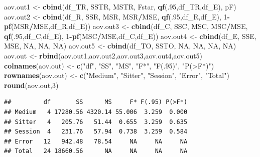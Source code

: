 \documentclass[
]{book}
\newenvironment{Shaded}{\begin{snugshade}}{\end{snugshade}}
\newcommand{\ConstantTok}[1]{\textcolor[rgb]{0.56,0.35,0.01}{#1}}
\newcommand{\DecValTok}[1]{\textcolor[rgb]{0.00,0.00,0.81}{#1}}
\newcommand{\FunctionTok}[1]{\textcolor[rgb]{0.13,0.29,0.53}{\textbf{#1}}}
\newcommand{\NormalTok}[1]{#1}
\newcommand{\OtherTok}[1]{\textcolor[rgb]{0.56,0.35,0.01}{#1}}
\newcommand{\SpecialCharTok}[1]{\textcolor[rgb]{0.81,0.36,0.00}{\textbf{#1}}}
\newcommand{\StringTok}[1]{\textcolor[rgb]{0.31,0.60,0.02}{#1}}
\begin{document}
\begin{Shaded}
\begin{Highlighting}[]
\NormalTok{aov.out1 }\OtherTok{\textless{}{-}} \FunctionTok{cbind}\NormalTok{(df\_TR, SSTR, MSTR, Fstar, }\FunctionTok{qf}\NormalTok{(.}\DecValTok{95}\NormalTok{,df\_TR,df\_E), pF)}
\NormalTok{aov.out2 }\OtherTok{\textless{}{-}} \FunctionTok{cbind}\NormalTok{(df\_R, SSR, MSR, MSR}\SpecialCharTok{/}\NormalTok{MSE, }\FunctionTok{qf}\NormalTok{(.}\DecValTok{95}\NormalTok{,df\_R,df\_E), }\DecValTok{1}\SpecialCharTok{{-}}\FunctionTok{pf}\NormalTok{(MSR}\SpecialCharTok{/}\NormalTok{MSE,df\_R,df\_E))}
\NormalTok{aov.out3 }\OtherTok{\textless{}{-}} \FunctionTok{cbind}\NormalTok{(df\_C, SSC, MSC, MSC}\SpecialCharTok{/}\NormalTok{MSE, }\FunctionTok{qf}\NormalTok{(.}\DecValTok{95}\NormalTok{,df\_C,df\_E), }\DecValTok{1}\SpecialCharTok{{-}}\FunctionTok{pf}\NormalTok{(MSC}\SpecialCharTok{/}\NormalTok{MSE,df\_C,df\_E))}
\NormalTok{aov.out4 }\OtherTok{\textless{}{-}} \FunctionTok{cbind}\NormalTok{(df\_E, SSE, MSE, }\ConstantTok{NA}\NormalTok{, }\ConstantTok{NA}\NormalTok{, }\ConstantTok{NA}\NormalTok{)}
\NormalTok{aov.out5 }\OtherTok{\textless{}{-}} \FunctionTok{cbind}\NormalTok{(df\_TO, SSTO, }\ConstantTok{NA}\NormalTok{, }\ConstantTok{NA}\NormalTok{, }\ConstantTok{NA}\NormalTok{, }\ConstantTok{NA}\NormalTok{)}
\NormalTok{aov.out }\OtherTok{\textless{}{-}} \FunctionTok{rbind}\NormalTok{(aov.out1,aov.out2,aov.out3,aov.out4,aov.out5)}
\FunctionTok{colnames}\NormalTok{(aov.out) }\OtherTok{\textless{}{-}} \FunctionTok{c}\NormalTok{(}\StringTok{"df"}\NormalTok{, }\StringTok{"SS"}\NormalTok{, }\StringTok{"MS"}\NormalTok{, }\StringTok{"F*"}\NormalTok{, }\StringTok{"F(.95)"}\NormalTok{, }\StringTok{"P(\textgreater{}F*)"}\NormalTok{)}
\FunctionTok{rownames}\NormalTok{(aov.out) }\OtherTok{\textless{}{-}} \FunctionTok{c}\NormalTok{(}\StringTok{"Medium"}\NormalTok{, }\StringTok{"Sitter"}\NormalTok{, }\StringTok{"Session"}\NormalTok{, }\StringTok{"Error"}\NormalTok{, }\StringTok{"Total"}\NormalTok{)}
\FunctionTok{round}\NormalTok{(aov.out,}\DecValTok{3}\NormalTok{)}
\end{Highlighting}
\end{Shaded}

\begin{verbatim}
##         df       SS      MS     F* F(.95) P(>F*)
## Medium   4 17280.56 4320.14 55.006  3.259  0.000
## Sitter   4   205.76   51.44  0.655  3.259  0.635
## Session  4   231.76   57.94  0.738  3.259  0.584
## Error   12   942.48   78.54     NA     NA     NA
## Total   24 18660.56      NA     NA     NA     NA
\end{verbatim}
\end{document}
